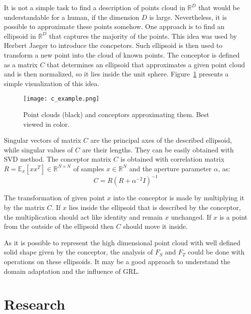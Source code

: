 \documentclass{article}
\begin{document}
\par
It is not a simple task to find a description of points cloud in $\mathbb{R}^{D}$ that would be understandable for a human, if the dimension $D$ is large. Nevertheless, it is possible to approximate these points somehow. One approach is to find an ellipsoid in $\mathbb{R}^{D}$ that captures the majority of the points. This idea was used by Herbert Jaeger to introduce the concpetors. Such ellipsoid is then used to transform a new point into the cloud of known points. The conceptor is defined as a matrix $C$ that determines an ellipsoid that approximates a given point cloud and is then normalized, so it lies inside the unit sphere. Figure~\ref{fig:conceptor_intro} presents a simple visualization of this idea.
\begin{figure}%
    \centering
    \texttt{[image: c\_example.png]}%
    \caption{Point clouds (black) and conceptors approximating them. Best viewed in color.}
    \label{fig:conceptor_intro}%
\end{figure}
Singular vectors of matrix $C$ are the principal axes of the described ellipsoid, while singular values of $C$ are their lengths. They can be easily obtained with SVD method. The conceptor matrix $C$ is obtained with correlation matrix $R = \mathbb{E}_{x}[xx^{T}] \in \mathbb{R}^{N\times N}$ of samples $x \in \mathbb{R}^{N}$ and the aperture parameter $\alpha$, as:
\begin{equation*}
    C = R(R + \alpha^{-2} I)^{-1}
\end{equation*}
\par
The transformation of given point $x$ into the conceptor is made by multiplying it by the matrix $C$. If $x$ lies inside the ellipsoid that is described by the conceptor, the multiplication should act like identity and remain $x$ unchanged. If $x$ is a point from the outside of the ellipsoid then $C$ should move it inside.
\par
As it is possible to represent the high dimensional point cloud with well defined solid shape given by the conceptor, the analysis of $F_{S}$ and $F_{T}$ could be done with operations on these ellipsoids. It may be a good approach to understand the domain adaptation and the influence of GRL.

\section{Research}
\end{document}
